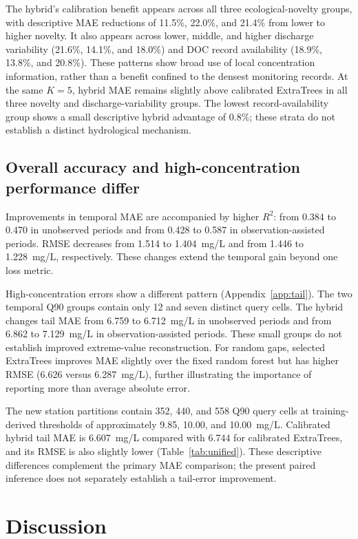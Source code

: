 \documentclass[11pt]{article}
\begin{document}
The hybrid's calibration benefit appears across all three ecological-novelty groups, with descriptive MAE reductions of 11.5\%, 22.0\%, and 21.4\% from lower to higher novelty. It also appears across lower, middle, and higher discharge variability (21.6\%, 14.1\%, and 18.0\%) and DOC record availability (18.9\%, 13.8\%, and 20.8\%). These patterns show broad use of local concentration information, rather than a benefit confined to the densest monitoring records. At the same $K=5$, hybrid MAE remains slightly above calibrated ExtraTrees in all three novelty and discharge-variability groups. The lowest record-availability group shows a small descriptive hybrid advantage of 0.8\%; these strata do not establish a distinct hydrological mechanism.

\subsection{Overall accuracy and high-concentration performance differ}
Improvements in temporal MAE are accompanied by higher $R^2$: from 0.384 to 0.470 in unobserved periods and from 0.428 to 0.587 in observation-assisted periods. RMSE decreases from 1.514 to 1.404~mg/L and from 1.446 to 1.228~mg/L, respectively. These changes extend the temporal gain beyond one loss metric.

High-concentration errors show a different pattern (Appendix~\ref{app:tail}). The two temporal Q90 groups contain only 12 and seven distinct query cells. The hybrid changes tail MAE from 6.759 to 6.712~mg/L in unobserved periods and from 6.862 to 7.129~mg/L in observation-assisted periods. These small groups do not establish improved extreme-value reconstruction. For random gaps, selected ExtraTrees improves MAE slightly over the fixed random forest but has higher RMSE (6.626 versus 6.287~mg/L), further illustrating the importance of reporting more than average absolute error.

The new station partitions contain 352, 440, and 558 Q90 query cells at training-derived thresholds of approximately 9.85, 10.00, and 10.00~mg/L. Calibrated hybrid tail MAE is 6.607~mg/L compared with 6.744 for calibrated ExtraTrees, and its RMSE is also slightly lower (Table~\ref{tab:unified}). These descriptive differences complement the primary MAE comparison; the present paired inference does not separately establish a tail-error improvement.

\FloatBarrier
\section{Discussion}
\end{document}
